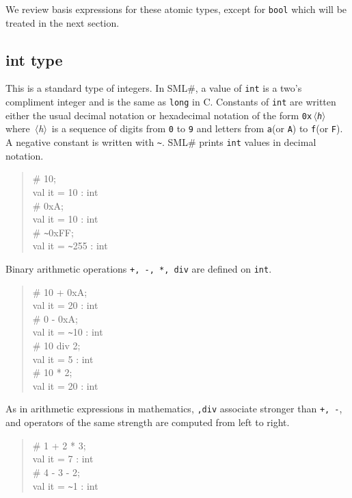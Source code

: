\documentclass{jbook}
\newcommand{\smlsharp}{SML\#}
\newcommand{\code}[1]{\mbox{\large\tt #1}}
\newcommand{\nonterm}[1]{\mbox{$\,\langle$}{\it #1}\mbox{$\rangle\,$}}
\newenvironment{program}{\begin{quote}\begin{tt}}%
                        {\end{tt}\end{quote}}
\begin{document}
	We review basis expressions for these atomic types, except for
{\tt bool} which will be treated in the next section.

\subsection{int type}
	This is a standard type of integers.
	In \smlsharp{}, a value of {\tt int} is a two's compliment
integer and is the same as \code{long} in C.
	Constants of {\tt int} are written either the usual decimal
notation or hexadecimal notation of the form {\tt 0x\nonterm{h}} 
where \nonterm{h} is a sequence of digits from {\tt 0} to {\tt 9} and
letters from {\tt a}(or {\tt A}) to {\tt f}(or {\tt F}).
	A negative constant is written with \verb|~|.
	\smlsharp{} prints {\tt int} values in decimal notation.
\begin{program}
\# 10;\\
val it = 10 : int\\
\# 0xA;\\
val it = 10 : int\\
\# \verb|~|0xFF;\\
val it = \verb|~|255 : int
\end{program}
	Binary arithmetic operations {\tt +, -, *, div} are defined on 
{\tt int}.
\begin{program}
\# 10 + 0xA;\\
val it = 20 : int\\
\# 0 - 0xA;\\
val it = \verb|~|10 : int\\
\# 10 div 2;\\
val it = 5 : int\\
\# 10 * 2;\\
val it = 20 : int
\end{program}
	As in arithmetic expressions in mathematics, {\tt *,div}
associate stronger than {\tt +, -}, and operators of the same strength
are computed from left to right.
\begin{program}
\# 1 + 2 * 3;\\
val it = 7 : int\\
\# 4 - 3 - 2;\\
val it = \verb|~|1 : int
\end{program}
\end{document}

